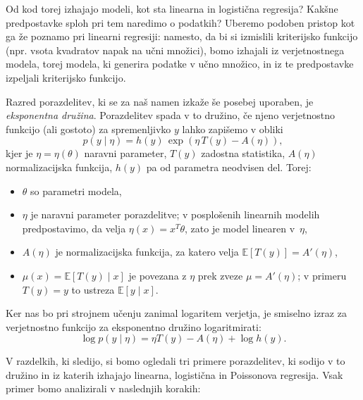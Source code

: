 Od kod torej izhajajo modeli, kot sta linearna in logistična regresija? Kakšne predpostavke sploh pri tem naredimo o podatkih? Uberemo podoben pristop kot ga že poznamo pri linearni regresiji: namesto, da bi si izmislili kriterijsko funkcijo (npr. vsota kvadratov napak na učni množici), bomo izhajali iz verjetnostnega modela, torej modela, ki generira podatke v učno množico, in iz te predpostavke izpeljali kriterijsko funkcijo.

Razred porazdelitev, ki se za naš namen izkaže še posebej uporaben, je \emph{eksponentna družina}. Porazdelitev spada v to družino, če njeno verjetnostno funkcijo (ali gostoto) za spremenljivko $y$ lahko zapišemo v obliki
\[
p(y \mid \eta) = h(y)\,\exp\left(\eta\,T(y) - A(\eta)\right),
\]
kjer je $\eta = \eta(\theta)$ naravni parameter, $T(y)$ zadostna statistika,
$A(\eta)$ normalizacijska funkcija, $h(y)$ pa od parametra neodvisen del. Torej:
\begin{itemize}
  \item $\theta$ so parametri modela,
  \item $\eta$ je naravni parameter porazdelitve; v posplošenih linearnih modelih predpostavimo, da velja $\eta(x)=x^T\theta$, zato je model linearen v~$\eta$,
%
%
  \item $A(\eta)$ je normalizacijska funkcija, za katero velja $\mathbb{E}[T(y)] = A'(\eta)$,
  \item $\mu(x)=\mathbb{E}[T(y)\mid x]$ je povezana z $\eta$ prek zveze $\mu = A'(\eta)$; v primeru $T(y)=y$ to ustreza $\mathbb{E}[y \mid x]$.
\end{itemize}

Ker nas bo pri strojnem učenju zanimal logaritem verjetja, je smiselno izraz za verjetnostno funkcijo za eksponentno družino logaritmirati:
\[
\log p(y \mid \eta) = \eta T(y) - A(\eta) + \log h(y).
\]

V razdelkih, ki sledijo, si bomo ogledali tri primere porazdelitev,
ki sodijo v to družino in iz katerih izhajajo linearna, logistična
in Poissonova regresija. Vsak primer bomo analizirali v naslednjih korakih:

